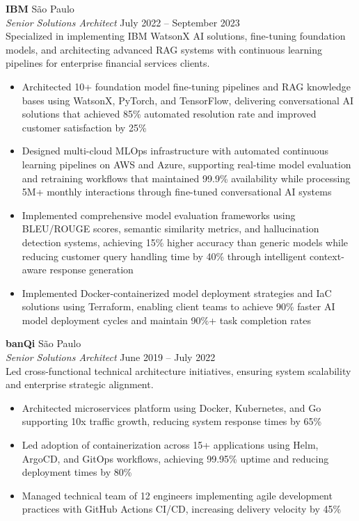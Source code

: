 \documentclass[a4paper]{article}
\begin{document}
\textbf{IBM}                                                      \hfill São Paulo              \\
\textit{Senior Solutions Architect}                               \hfill July 2022 – September 2023    \\
\vspace{0.5mm} 
Specialized in implementing IBM WatsonX AI solutions, fine-tuning foundation models, and architecting advanced RAG systems with continuous learning pipelines for enterprise financial services clients.
\vspace{-2mm}
\begin{itemize}
\setlength\itemsep{-1mm}
\item Architected 10+ foundation model fine-tuning pipelines and RAG knowledge bases using WatsonX, PyTorch, and TensorFlow, delivering conversational AI solutions that achieved 85\% automated resolution rate and improved customer satisfaction by 25\%
\item Designed multi-cloud MLOps infrastructure with automated continuous learning pipelines on AWS and Azure, supporting real-time model evaluation and retraining workflows that maintained 99.9\% availability while processing 5M+ monthly interactions through fine-tuned conversational AI systems
\item Implemented comprehensive model evaluation frameworks using BLEU/ROUGE scores, semantic similarity metrics, and hallucination detection systems, achieving 15\% higher accuracy than generic models while reducing customer query handling time by 40\% through intelligent context-aware response generation
\item Implemented Docker-containerized model deployment strategies and IaC solutions using Terraform, enabling client teams to achieve 90\% faster AI model deployment cycles and maintain 90\%+ task completion rates
\end{itemize}

\textbf{banQi}                                 \hfill São Paulo             \\
\textit{Senior Solutions Architect}            \hfill June 2019 – July 2022   \\
\vspace{0.5mm}
Led cross-functional technical architecture initiatives, ensuring system scalability and enterprise strategic alignment.
\vspace{-2mm}
\begin{itemize}
\setlength\itemsep{-1mm}
\item Architected microservices platform using Docker, Kubernetes, and Go supporting 10x traffic growth, reducing system response times by 65\%
\item Led adoption of containerization across 15+ applications using Helm, ArgoCD, and GitOps workflows, achieving 99.95\% uptime and reducing deployment times by 80\%
\item Managed technical team of 12 engineers implementing agile development practices with GitHub Actions CI/CD, increasing delivery velocity by 45\%
\end{itemize}
\end{document}
